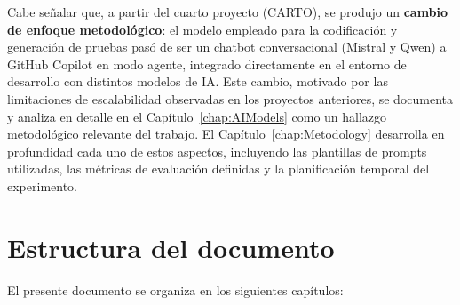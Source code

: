 Cabe señalar que, a partir del cuarto proyecto (\ac{CARTO}), se produjo un \textbf{cambio de enfoque metodológico}: el modelo empleado para la codificación y generación de pruebas pasó de ser un chatbot conversacional (Mistral y Qwen) a GitHub Copilot en modo agente, integrado directamente en el entorno de desarrollo con distintos modelos de \ac{IA}. Este cambio, motivado por las limitaciones de escalabilidad observadas en los proyectos anteriores, se documenta y analiza en detalle en el Capítulo~\ref{chap:AIModels} como un hallazgo metodológico relevante del trabajo. El Capítulo~\ref{chap:Metodology} desarrolla en profundidad cada uno de estos aspectos, incluyendo las plantillas de prompts utilizadas, las métricas de evaluación definidas y la planificación temporal del experimento.\\

\section{Estructura del documento} \label{sec:estructura-documento}

El presente documento se organiza en los siguientes capítulos:

